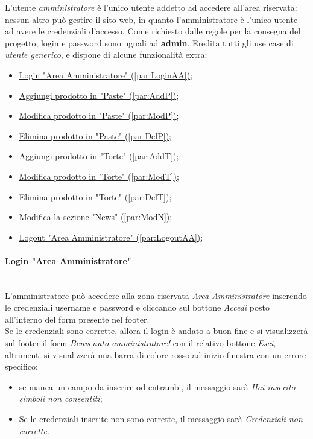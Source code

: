 L'utente \emph{amministratore} è l'unico utente addetto ad accedere all'area riservata: nessun altro può gestire il sito web, in quanto l'amministratore è l'unico utente ad avere le credenziali d'accesso.  Come richiesto dalle regole per la consegna del progetto, login e password sono uguali ad \textbf{admin}. Eredita tutti gli use case di \textit{utente generico}, e dispone di alcune funzionalità extra:
\begin{itemize}
	\item \hyperref[par:LoginAA]{ Login "Area Amministratore" (\ref{par:LoginAA})};
	\item \hyperref[par:AddP]{ Aggiungi prodotto in "Paste" (\ref{par:AddP})};
	\item \hyperref[par:ModP]{ Modifica prodotto in "Paste" (\ref{par:ModP})};
	\item \hyperref[par:DelP]{ Elimina prodotto in "Paste" (\ref{par:DelP})};
	\item \hyperref[par:AddT]{ Aggiungi prodotto in "Torte" (\ref{par:AddT})};
	\item \hyperref[par:ModT]{ Modifica prodotto in "Torte" (\ref{par:ModT})};
	\item \hyperref[par:DelT]{ Elimina prodotto in "Torte" (\ref{par:DelT})};
	\item \hyperref[par:ModN]{ Modifica la sezione "News" (\ref{par:ModN})};
	\item \hyperref[par:LogoutAA]{ Logout "Area Amministratore" (\ref{par:LogoutAA})};
\end{itemize}

\paragraph{Login "Area Amministratore"}\mbox{}\\
\label{par:LoginAA}
L'amministratore può accedere alla zona riservata \emph{Area Amministratore} inserendo le credenziali username e password e cliccando sul bottone \emph{Accedi} posto all'interno del form presente nel footer.\\ Se le credenziali sono corrette, allora il login è andato a buon fine e si visualizzerà sul footer il form \emph{Benvenuto amministratore!} con il relativo bottone \emph{Esci}, altrimenti si visualizzerà una barra di colore rosso ad inizio finestra con un errore specifico:
\begin{itemize}
	\item se manca un campo da inserire od entrambi, il messaggio sarà \emph{Hai inserito simboli non consentiti};
	\item Se le credenziali inserite non sono corrette, il messaggio sarà \emph{Credenziali non corrette}.
\end{itemize}

